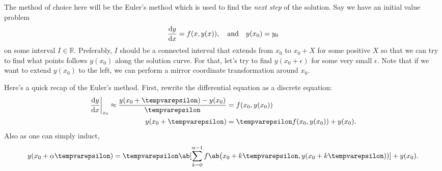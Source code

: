 The method of choice here will be the Euler's method which is used to find the \emph{next
step} of the solution. Say we have an initial value problem
\begin{equation}
  \odv{y}{x} = f(x, y(x)), \mathand y(x_0) = y_0
\end{equation}
on some interval \(I \in \mathbb{R}\). Preferably, \(I\) should be a connected interval
that extends from \(x_0\) to \(x_0 + X\) for some positive \(X\) so that we can try to
find what points follows \(y(x_0)\) along the solution curve. For that, let's try to
find \(y(x_0 + \epsilon)\) for some very small \(\epsilon\). Note that if we want to
extend \(y(x_0)\) to the left, we can perform a mirror coordinate transformation around \(x_0\).

Here's a quick recap of the Euler's method. First, rewrite the differential equation
as a discrete equation:
\begin{align}
  \odv{y}{x}_{x_0} \approx \frac{y(x_0 + \epsilon) - y(x_0)}{\epsilon} & = f(x_0, y(x_0))                    \\
  y(x_0 + \epsilon)                                                    & = \epsilon f(x_0, y(x_0)) + y(x_0).
\end{align}
Also as one can simply induct,
\begin{equation}
  y(x_0 + \alpha\epsilon) = \epsilon\ab[\sum_{k = 0}^{\alpha - 1} f\ab\big(x_0 + k\epsilon, y(x_0 + k\epsilon))]
                            + y(x_0). \label{eq:existenceuniqueness-euler}
\end{equation}

